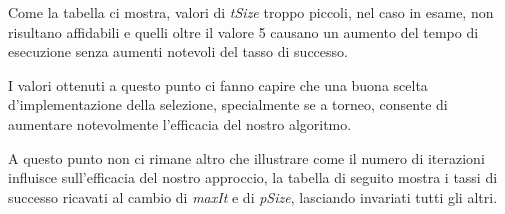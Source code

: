\vspace{3mm}
Come la tabella ci mostra, valori di \textit{tSize} troppo piccoli, nel caso in esame, non risultano affidabili e quelli oltre il valore 5 causano un aumento del tempo di esecuzione senza aumenti notevoli del tasso di successo.

I valori ottenuti a questo punto ci fanno capire che una buona scelta d'implementazione della selezione, specialmente se a torneo, consente di aumentare notevolmente l'efficacia del nostro algoritmo.
\vspace{3mm}

A questo punto non ci rimane altro che illustrare come il numero di iterazioni influisce sull'efficacia del nostro approccio, la tabella di seguito mostra i tassi di successo ricavati al cambio di \textit{maxIt} e di \textit{pSize}, lasciando invariati tutti gli altri.
